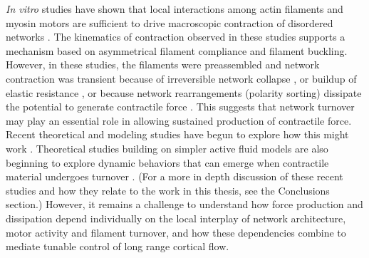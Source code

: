 {\em In vitro} studies have shown that local interactions among actin filaments and myosin motors are sufficient to drive macroscopic contraction of disordered networks \cite{rheo_2D1}.  The kinematics of contraction observed in these studies supports a mechanism based on asymmetrical filament compliance and filament buckling.  However, in these studies, the filaments were preassembled and network contraction was transient because of irreversible network collapse \cite{Alvarado:2013aa}, or buildup of elastic resistance \cite{Murrell15062014}, or because network rearrangements (polarity sorting) dissipate the potential to generate contractile force \cite{Ennomani2016616, Reymann1310, Ndlec:1997aa,Surrey1167}. This suggests that network turnover may play an essential role in allowing sustained production of contractile force. Recent theoretical and modeling studies have begun to explore how this might work \cite{2015arXiv150706182H, Mak:2016aa, 10.1371/journal.pone.0000696}. Theoretical studies building on simpler active fluid models are also beginning to explore dynamic behaviors that can emerge when contractile material undergoes turnover \cite{PhysRevLett.103.058102,PhysRevLett.113.148102}. (For a more in depth discussion of these recent studies and how they relate to the work in this thesis, see the Conclusions section.) However, it remains a challenge to understand how force production and dissipation depend individually on the local interplay of network architecture, motor activity and filament turnover, and how these dependencies combine to mediate tunable control of long range cortical flow. 



